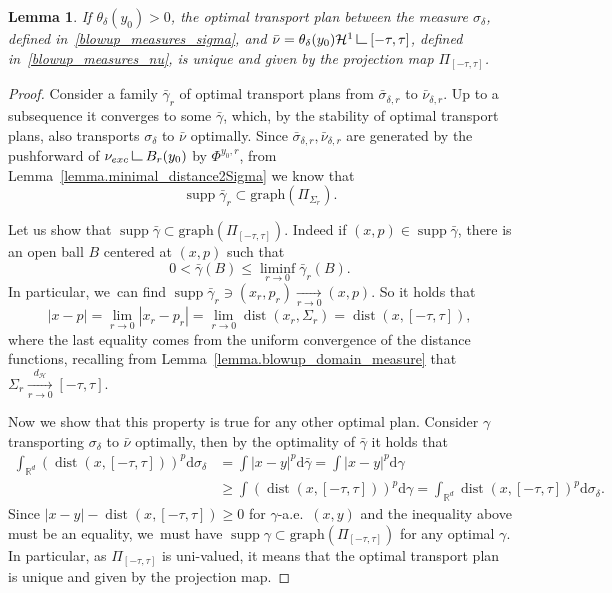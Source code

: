 \documentclass[11pt]{article}
\numberwithin{equation}{section}
\newtheorem{lemma}[theorem]{Lemma}
\theoremstyle{definition}
\newcommand\LM[1]{\hbox{\vrule width.5pt \vbox to#1pt{\vfill \hrule width#1pt height.5pt}}}
\newcommand\LL{{\mathchoice {\>\LM7\>}{\>\LM7\>}{\,\LM5\,}{\,\LM{3.35}\,}}}
\newcommand{\mres}{\LL}
\newcommand\cH{\mathcal{H}}
\newcommand{\RR}{\mathbb{R}}
\DeclareMathOperator{\dist}{dist}
\DeclareMathOperator{\supp}{supp}
\newcommand{\distH}{d_{\mathcal{H}}}
\newcommand{\nuexc}{\nu_{\textup{exc}}}
\newcommand\dd{\mathrm{d}}
\begin{document}
\begin{lemma}\label{lemma.brenier_map_blowup_family}
If $\theta_\delta(y_0)>0$, the optimal transport plan between the measure $\sigma_{\delta}$, defined in~\eqref{blowup_measures_sigma}, and $\bar \nu = \theta_\delta(y_0)\cH^1\mres [-\tau, \tau]$, defined in~\eqref{blowup_measures_nu}, is unique and given by the projection map $\Pi_{[-\tau, \tau]}$.
\end{lemma}

\begin{proof}
Consider a family $\bar \gamma_r$ of optimal transport plans from $\bar \sigma_{\delta , r}$ to $\bar \nu_{\delta ,r}$. Up to a subsequence it converges to some $\bar \gamma$, which, by the stability of optimal transport plans, also transports $\sigma_{\delta}$ to $\bar \nu$ optimally. Since $\bar \sigma_{\delta , r}, \bar \nu_{\delta ,r}$ are generated by the pushforward of $\nuexc\mres B_r(y_0)$ by $\Phi^{y_0, r}$, from Lemma~\ref{lemma.minimal_distance2Sigma} we know that
\[
\supp \bar \gamma_r \subset \text{graph}(\Pi_{\Sigma_r}).
\]

Let us show that $\supp \bar \gamma \subset \text{graph}\left(\Pi_{[-\tau, \tau]}\right)$. Indeed if $(x,p) \in \supp \bar \gamma$, there is an open ball $B$ centered at $(x,p)$ such that
\[
0 < \bar \gamma(B) \le \liminf_{r \to 0} \bar\gamma_r(B).
\]
In particular, we~can find $\supp \bar \gamma_r \ni (x_r, p_r) \xrightarrow[r \to 0]{} (x,p)$. So it holds that
\[
|x - p|
=
\lim_{r \to 0}
|x_r - p_r|
=
\lim_{r \to 0}
\dist\left(x_r, \Sigma_r\right)
=
\dist(x, [-\tau, \tau]),
\]
where the last equality comes from the uniform convergence of the distance functions, recalling from Lemma~\ref{lemma.blowup_domain_measure} that $\Sigma_r \xrightarrow[r \to 0]{\distH} [-\tau, \tau]$.

Now we show that this property is true for any other optimal plan. Consider $\gamma$ transporting $\sigma_{\delta}$ to $\bar \nu$ optimally, then by the optimality of $\bar \gamma$ it holds that
\begin{align*}
\int_{\RR^d} (\dist(x, [-\tau, \tau]))^p\dd \sigma_{\delta}
&=
\int |x - y|^p\dd \bar\gamma
= \int |x - y|^p\dd \gamma\\
&\ge
\int (\dist(x, [-\tau, \tau]))^p \dd \gamma
=
\int_{\RR^d} \dist(x, [-\tau, \tau])^p\dd \sigma_{\delta}.
\end{align*}
Since $|x - y| - \dist(x,[-\tau, \tau]) \ge 0 $ for $\gamma$-a.e.\ $(x,y)$ and the inequality above must be an equality, we~must have $\supp \gamma \subset \text{graph}\left(\Pi_{[-\tau, \tau]}\right)$ for any optimal $\gamma$. In particular, as $\Pi_{[-\tau, \tau]}$ is uni-valued, it means that the optimal transport plan is unique and given by the projection map.
\end{proof}
\end{document}
